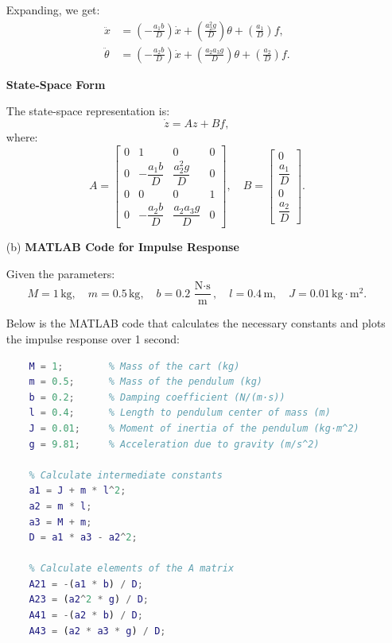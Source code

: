 \documentclass{article}
\begin{document}
\begin{enumerate}
    Expanding, we get:
    \begin{align*}
    \ddot{x} &= \left( -\frac{a_1 b}{D} \right) \dot{x} + \left( \frac{a_2^2 g}{D} \right) \theta + \left( \frac{a_1}{D} \right) f, \\
    \ddot{\theta} &= \left( -\frac{a_2 b}{D} \right) \dot{x} + \left( \frac{a_2 a_3 g}{D} \right) \theta + \left( \frac{a_2}{D} \right) f.
    \end{align*}

    \textbf{State-Space Form}

    The state-space representation is:
    \[
    \dot{z} = A z + B f,
    \]
    where:
    \[
    A =
    \begin{bmatrix}
    0 & 1 & 0 & 0 \\
    0 & -\dfrac{a_1 b}{D} & \dfrac{a_2^2 g}{D} & 0 \\
    0 & 0 & 0 & 1 \\
    0 & -\dfrac{a_2 b}{D} & \dfrac{a_2 a_3 g}{D} & 0
    \end{bmatrix}, \quad
    B =
    \begin{bmatrix}
    0 \\
    \dfrac{a_1}{D} \\
    0 \\
    \dfrac{a_2}{D}
    \end{bmatrix}.
    \]

    \item[(b)] \textbf{MATLAB Code for Impulse Response}

    Given the parameters:
    \[
    M = 1\, \text{kg}, \quad m = 0.5\, \text{kg}, \quad b = 0.2\, \frac{\text{N}\cdot\text{s}}{\text{m}}, \quad l = 0.4\, \text{m}, \quad J = 0.01\, \text{kg}\cdot\text{m}^2.
    \]

    Below is the MATLAB code that calculates the necessary constants and plots the impulse response over 1 second:

    \begin{lstlisting}[language=Matlab]
    % Define the given parameters
    M = 1;        % Mass of the cart (kg)
    m = 0.5;      % Mass of the pendulum (kg)
    b = 0.2;      % Damping coefficient (N/(m·s))
    l = 0.4;      % Length to pendulum center of mass (m)
    J = 0.01;     % Moment of inertia of the pendulum (kg·m^2)
    g = 9.81;     % Acceleration due to gravity (m/s^2)

    % Calculate intermediate constants
    a1 = J + m * l^2;
    a2 = m * l;
    a3 = M + m;
    D = a1 * a3 - a2^2;

    % Calculate elements of the A matrix
    A21 = -(a1 * b) / D;
    A23 = (a2^2 * g) / D;
    A41 = -(a2 * b) / D;
    A43 = (a2 * a3 * g) / D;


\end{lstlisting}
\end{enumerate}
\end{document}
